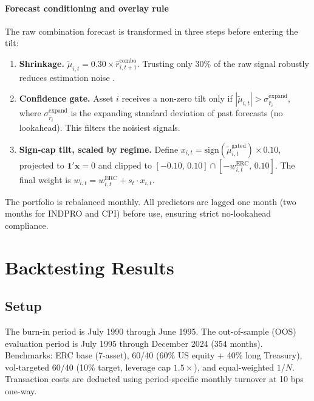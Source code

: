 \documentclass[11pt,letterpaper]{article}
\begin{document}
\paragraph{Forecast conditioning and overlay rule}
The raw combination forecast is transformed in three steps before entering the tilt:
\begin{enumerate}[leftmargin=1.4em,itemsep=1pt,topsep=3pt]
  \item \textbf{Shrinkage.} $\tilde{\mu}_{i,t} = 0.30 \times \hat{r}_{i,t+1}^{\text{combo}}$.
    Trusting only 30\% of the raw signal robustly reduces estimation noise
    \citep{CampbellThompson2008}.
  \item \textbf{Confidence gate.} Asset $i$ receives a non-zero tilt only if
    $|\tilde{\mu}_{i,t}| > \sigma_{\hat{r}_i}^{\text{expand}}$, where
    $\sigma_{\hat{r}_i}^{\text{expand}}$ is the expanding standard deviation of
    past forecasts (no lookahead). This filters the noisiest signals.
  \item \textbf{Sign-cap tilt, scaled by regime.} Define
    $x_{i,t} = \text{sign}(\tilde{\mu}_{i,t}^{\text{gated}}) \times 0.10$,
    projected to $\mathbf{1}'\mathbf{x}=0$ and clipped to
    $[-0.10,\,0.10]\cap[-w^{\text{ERC}}_{i,t},\,0.10]$.
    The final weight is $w_{i,t} = w^{\text{ERC}}_{i,t} + s_t \cdot x_{i,t}$.
\end{enumerate}

The portfolio is rebalanced monthly. All predictors are lagged one month (two months
for INDPRO and CPI) before use, ensuring strict no-lookahead compliance.

\section{Backtesting Results}

\subsection{Setup}

The burn-in period is July 1990 through June 1995. The out-of-sample (OOS)
evaluation period is July 1995 through December 2024 (354 months). Benchmarks: ERC
base (7-asset), 60/40 (60\% US equity + 40\% long Treasury), vol-targeted 60/40
(10\% target, leverage cap $1.5\times$), and equal-weighted $1/N$. Transaction
costs are deducted using period-specific monthly turnover at 10 bps one-way.
\end{document}
